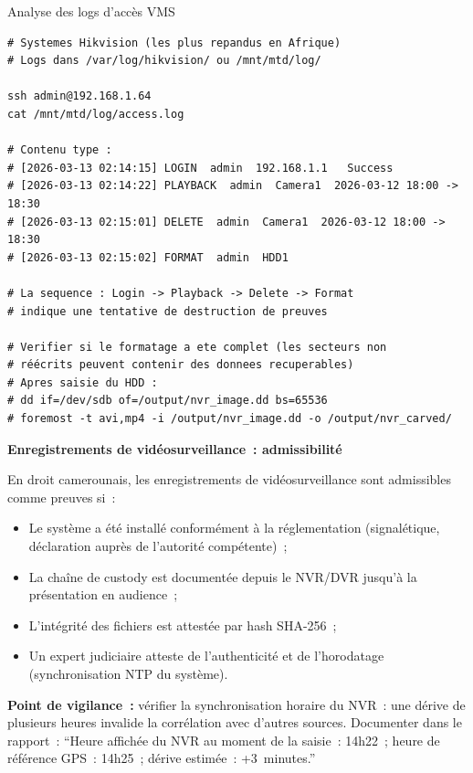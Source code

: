 \begin{boxoutils}{Analyse des logs d'accès VMS}
\begin{lstlisting}[language=bash_forensique]
# Systemes Hikvision (les plus repandus en Afrique)
# Logs dans /var/log/hikvision/ ou /mnt/mtd/log/

ssh admin@192.168.1.64
cat /mnt/mtd/log/access.log

# Contenu type :
# [2026-03-13 02:14:15] LOGIN  admin  192.168.1.1   Success
# [2026-03-13 02:14:22] PLAYBACK  admin  Camera1  2026-03-12 18:00 -> 18:30
# [2026-03-13 02:15:01] DELETE  admin  Camera1  2026-03-12 18:00 -> 18:30
# [2026-03-13 02:15:02] FORMAT  admin  HDD1

# La sequence : Login -> Playback -> Delete -> Format
# indique une tentative de destruction de preuves

# Verifier si le formatage a ete complet (les secteurs non
# réécrits peuvent contenir des donnees recuperables)
# Apres saisie du HDD :
# dd if=/dev/sdb of=/output/nvr_image.dd bs=65536
# foremost -t avi,mp4 -i /output/nvr_image.dd -o /output/nvr_carved/
\end{lstlisting}
\end{boxoutils}

\begin{boxjuris}
\textbf{Enregistrements de vidéosurveillance~: admissibilité}

En droit camerounais, les enregistrements de vidéosurveillance sont
admissibles comme preuves si~:
\begin{itemize}
    \item Le système a été installé conformément à la réglementation
          (signalétique, déclaration auprès de l'autorité compétente)~;
    \item La chaîne de custody est documentée depuis le NVR/DVR
          jusqu'à la présentation en audience~;
    \item L'intégrité des fichiers est attestée par hash SHA-256~;
    \item Un expert judiciaire atteste de l'authenticité et de
          l'horodatage (synchronisation NTP du système).
\end{itemize}
\textbf{Point de vigilance~:} vérifier la synchronisation horaire
du NVR~: une dérive de plusieurs heures invalide la corrélation
avec d'autres sources. Documenter dans le rapport~: ``Heure affichée
du NVR au moment de la saisie~: 14h22~; heure de référence GPS~:
14h25~; dérive estimée~: +3~minutes.''
\end{boxjuris}

